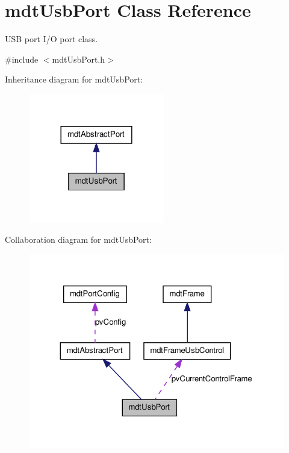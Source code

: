 \hypertarget{classmdt_usb_port}{
\section{mdtUsbPort Class Reference}
\label{classmdt_usb_port}
}


USB port I/O port class.  




{\ttfamily \#include $<$mdtUsbPort.h$>$}



Inheritance diagram for mdtUsbPort:\nopagebreak
\begin{figure}[H]
\begin{center}
\leavevmode
\includegraphics[width=168pt]{classmdt_usb_port__inherit__graph}
\end{center}
\end{figure}


Collaboration diagram for mdtUsbPort:
\nopagebreak
\begin{figure}[H]
\begin{center}
\leavevmode
\includegraphics[width=324pt]{classmdt_usb_port__coll__graph}
\end{center}
\end{figure}
